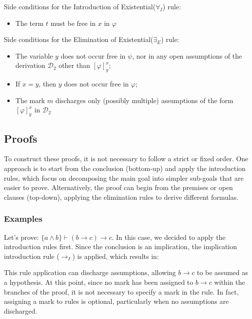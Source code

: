 \vspace{0.5cm}

Side conditions for the Introduction of Existential(\(\forall_I\)) rule:
\begin{itemize}
  \item The term \(t\) must be free in \(x\) in \(\varphi\)
\end{itemize}

Side conditions for the Elimination of Existential(\(\exists_E\)) rule:
\begin{itemize}
  \item The variable \(y\) does not occur free in \(\psi\), nor in any open assumptions of the derivation \(\mathcal{D}_2\) other than \([\varphi]^x_y\);
  \item If \(x = y\), then \(y\) does not occur free in \(\varphi\);
  \item The mark \(m\) discharges only (possibly multiple) assumptions of the form \([\varphi]^x_y\) in \(\mathcal{D}_2\)
\end{itemize}


\subsection{Proofs}

To construct these proofs, it is not necessary to follow a strict or fixed order. One approach is to start from the conclusion (bottom-up) and apply the introduction rules, which focus on decomposing the main goal into simpler sub-goals that are easier to prove. Alternatively, the proof can begin from the premises or open clauses (top-down), applying the elimination rules to derive different formulas.

\subsubsection*{Examples}
Let's prove: \(\{a \land b\} \vdash (b \to c) \to c\). In this case, we decided to apply the introduction rules first. Since the conclusion is an implication, the implication introduction rule (\(\to_I\)) is applied, which results in:

\begin{prooftree}
\end{prooftree}

This rule application can discharge assumptions, allowing \(b \to c\) to be assumed as a hypothesis. At this point, since no mark has been assigned to \(b \to c\) within the branches of the proof, it is not necessary to specify a mark in the rule. In fact, assigning a mark to rules is optional, particularly when no assumptions are discharged.

